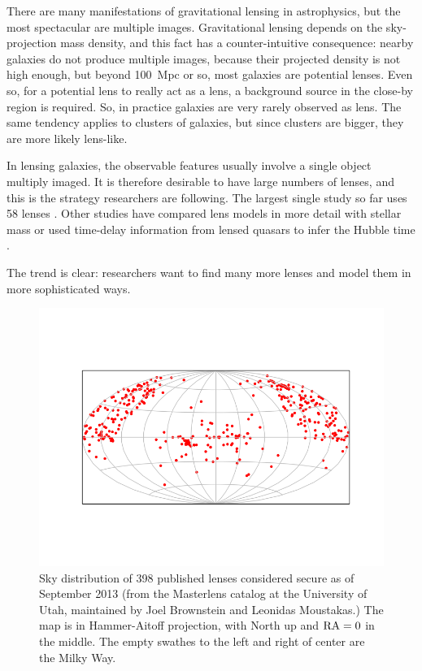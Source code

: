 \documentclass[12pt,preprint]{aastex}
\begin{document}
There are many manifestations of gravitational lensing in astrophysics,
but the most spectacular are multiple images.  Gravitational lensing
depends on the sky-projection mass density, and this fact has a
counter-intuitive consequence: nearby galaxies do not produce multiple
images, because their projected density is not high enough, but beyond
100~Mpc or so, most galaxies are potential lenses.  Even so, for a
potential lens to really act as a lens, a background source in the close-by
region is required.  So, in practice galaxies are very rarely observed
as lens.  The same tendency applies to clusters of galaxies, but since
clusters are bigger, they are more likely lens-like.

In lensing galaxies, the observable features usually involve a single
object multiply imaged.  It is therefore desirable to have large
numbers of lenses, and this is the strategy researchers are following.  The
largest single study so far uses 58 lenses \citep{2009ApJ...703L..51K}.
Other studies have compared lens models in more detail with stellar
mass \citep{2011ApJ...740...97L} or used time-delay information from
lensed quasars to infer the Hubble time
\citep{2008ApJ...679...17C,2010ApJ...712.1378P}.

The trend is clear: researchers want to find many more lenses and
model them in more sophisticated ways.

\begin{figure}
\centering
\includegraphics[width=.8\hsize]{fig/lenssky.png}
\caption{Sky distribution of 398 published lenses considered secure as
  of September 2013 (from the Masterlens catalog at the University of
  Utah, maintained by Joel Brownstein and Leonidas Moustakas.) The map
  is in Hammer-Aitoff projection, with North up and $\rm RA=0$ in the
  middle.  The empty swathes to the left and right of center are the
  Milky Way.}
\label{fig:masterlens}
\end{figure}
\end{document}
